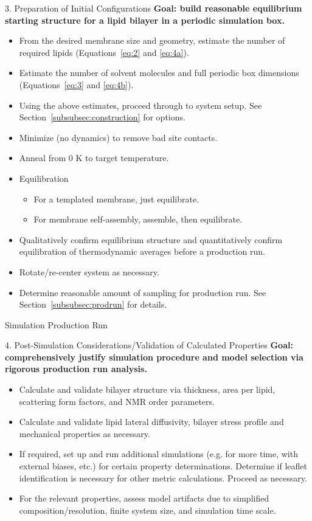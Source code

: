 \documentclass[9pt,bestpractices,pubversion]{livecoms}
\begin{document}
\begin{Checklists*}[p!]
\begin{checklist}{3. Preparation of Initial Configurations}
\textbf{Goal: build reasonable equilibrium starting structure for a lipid bilayer in a periodic simulation box.}
\begin{itemize}
\item From the desired membrane size and geometry, estimate the number of required lipids (Equations~\ref{eq:2} and \ref{eq:4a}).
\item Estimate the number of solvent molecules and full periodic box dimensions (Equations~\ref{eq:3} and \ref{eq:4b}).
\item Using the above estimates, proceed through to system setup. See Section~\ref{subsubsec:construction} for options.
\item Minimize (no dynamics) to remove bad site contacts.
\item Anneal from 0 K to target temperature.
\item Equilibration
	\begin{itemize}
	\item For a templated membrane, just equilibrate.
	\item For membrane self-assembly, assemble, then equilibrate.
	\end{itemize}
\item Qualitatively confirm equilibrium structure and quantitatively confirm equilibration of thermodynamic averages before a production run.
\item Rotate/re-center system as necessary.
\item Determine reasonable amount of sampling for production run. See Section~\ref{subsubsec:prodrun} for details.
\end{itemize}
\end{checklist}

\begin{checklist}{Simulation Production Run}
\end{checklist}

\begin{checklist}{4. Post-Simulation Considerations/Validation of Calculated Properties}
\textbf{Goal: comprehensively justify simulation procedure and model selection via rigorous production run analysis.}
\begin{itemize}
\item Calculate and validate bilayer structure via thickness, area per lipid, scattering form factors, and NMR order parameters.
\item Calculate and validate lipid lateral diffusivity, bilayer stress profile and mechanical properties as necessary.
\item If required, set up and run additional simulations (e.g. for more time, with external biases, etc.) for certain property determinations. Determine if leaflet identification is necessary for other metric calculations. Proceed as necessary.
\item For the relevant properties, assess model artifacts due to simplified composition/resolution, finite system size, and simulation time scale.
\end{itemize}
\end{checklist}


\end{Checklists*}
\end{document}
